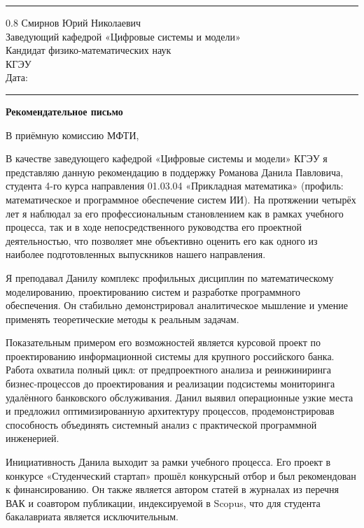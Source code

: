 \documentclass[a4paper,12pt]{article}
\begin{document}
\vspace{4pt}
\noindent\rule{\textwidth}{0.8pt}

\begin{flushright}
  \begin{spacing}{0.8}
    Смирнов Юрий Николаевич\\
    Заведующий кафедрой «Цифровые системы и модели»\\
    Кандидат физико-математических наук\\
    КГЭУ\\[6pt]
    Дата: \rule{4cm}{0.4pt}
  \end{spacing}
\end{flushright}

\begin{center}
  {\Large\bfseries Рекомендательное письмо}
\end{center}

В приёмную комиссию МФТИ,

В качестве заведующего кафедрой «Цифровые системы и модели» КГЭУ я представляю данную рекомендацию в поддержку Романова Данила Павловича, студента 4-го курса направления 01.03.04 «Прикладная математика» (профиль: ма\-те\-ма\-ти\-че\-ское и про\-грамм\-ное обес\-пе\-че\-ние систем ИИ). На протяжении четырёх лет я наблюдал за его профессиональным становлением как в рамках учебного процесса, так и в ходе непосредственного руководства его проектной деятельностью, что позволяет мне объективно оценить его как одного из наиболее подготовленных выпускников нашего направления.

Я преподавал Данилу комплекс профильных дисциплин по математическому моделированию, проектированию систем и разработке программного обеспечения. Он стабильно демонстрировал аналитическое мышление и умение применять теоретические методы к реальным задачам.

Показательным примером его возможностей является курсовой проект по проектированию информационной системы для крупного российского банка. Работа охватила полный цикл: от предпроектного анализа и реинжиниринга бизнес-процессов до проектирования и реализации подсистемы мониторинга удалённого банковского обслуживания. Данил выявил операционные узкие места и предложил оптимизированную архитектуру процессов, продемонстрировав способность объединять системный анализ с практической программной инженерией.

Инициативность Данила выходит за рамки учебного процесса. Его проект в конкурсе «Студенческий стартап» прошёл конкурсный отбор и был рекомендован к финансированию. Он также является автором статей в журналах из перечня ВАК и соавтором публикации, индексируемой в Scopus, что для студента бакалавриата является исключительным.
\end{document}
